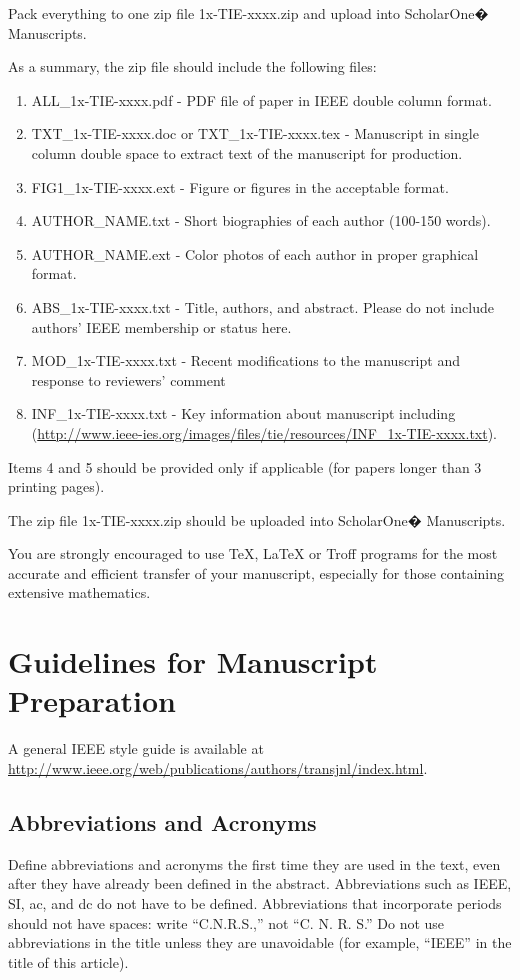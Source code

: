 \documentclass[journal]{IEEEtranTIE}
\begin{document}
Pack everything to one zip file 1x-TIE-xxxx.zip and upload into ScholarOne� Manuscripts.

As a summary, the zip file should include the following files:

\begin{enumerate}[1)]
	\item ALL\_1x-TIE-xxxx.pdf - PDF file of paper in IEEE double column format.
	\item TXT\_1x-TIE-xxxx.doc or TXT\_1x-TIE-xxxx.tex - Manuscript in single column double space to extract text of the manuscript for production.
	\item FIG1\_1x-TIE-xxxx.ext - Figure or figures in the acceptable format.
	\item AUTHOR\_NAME.txt - Short biographies of each author (100-150 words).
	\item AUTHOR\_NAME.ext - Color photos of each author in proper graphical format.
	\item ABS\_1x-TIE-xxxx.txt - Title, authors, and abstract. Please do not include authors' IEEE membership or status here.
	\item MOD\_1x-TIE-xxxx.txt - Recent modifications to the manuscript and response to reviewers' comment
	\item INF\_1x-TIE-xxxx.txt - Key information about manuscript including (\url{http://www.ieee-ies.org/images/files/tie/resources/INF_1x-TIE-xxxx.txt}).
\end{enumerate}

Items 4 and 5 should be provided only if applicable (for papers longer than 3 printing pages).

The zip file 1x-TIE-xxxx.zip should be uploaded into ScholarOne� Manuscripts.

You are strongly encouraged to use TeX, LaTeX or Troff programs for the most accurate and efficient transfer of your manuscript, especially for those containing extensive mathematics.


\section{Guidelines for Manuscript Preparation}
A general IEEE style guide is available at \url{http://www.ieee.org/web/publications/authors/transjnl/index.html}.

\subsection{Abbreviations and Acronyms}
Define abbreviations and acronyms the first time they are used in the text, even after they have already been defined in the abstract. Abbreviations such as IEEE, SI, ac, and dc do not have to be defined. Abbreviations that incorporate periods should not have spaces: write ``C.N.R.S.,'' not ``C. N. R. S.'' Do not use abbreviations in the title unless they are unavoidable (for example, ``IEEE'' in the title of this article).
\end{document}
